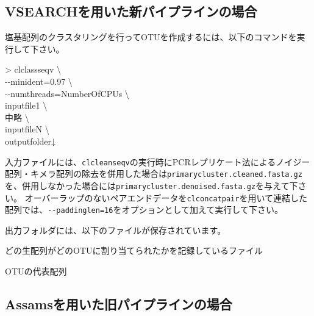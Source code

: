 \documentclass[titlepage,10pt,a4paper,english]{jsbook}
\newenvironment{cmd}{\begin{oframed}\raggedright\ttfamily\footnotesize\setlength{\baselineskip}{1.4em}}{\end{oframed}\vspace{-1em}}
\begin{document}
\subsection{VSEARCHを用いた新パイプラインの場合}

塩基配列のクラスタリングを行ってOTUを作成するには、以下のコマンドを実行して下さい。
\begin{cmd}
{\textgreater} clclassseqv {\textbackslash}\\
{-}{-}minident=0.97 {\textbackslash}\\
{-}{-}numthreads=NumberOfCPUs {\textbackslash}\\
inputfile1 {\textbackslash}\\
中略 {\textbackslash}\\
inputfileN {\textbackslash}\\
outputfolder↓
\end{cmd}
入力ファイルには、\texttt{clcleanseqv}の実行時にPCRレプリケート法によるノイジー配列・キメラ配列の除去を併用した場合は\texttt{primarycluster.cleaned.fasta.gz}を、併用しなかった場合には\texttt{primarycluster.denoised.fasta.gz}を与えて下さい。
オーバーラップのないペアエンドデータを\texttt{clconcatpair}を用いて連結した配列では、\texttt{{-}{-}paddinglen=16}をオプションとして加えて実行して下さい。

出力フォルダには、以下のファイルが保存されています。
\begin{description}\small\setlength{\baselineskip}{1.1em}
\item[clustered.otu.gz] どの生配列がどのOTUに割り当てられたかを記録しているファイル
\item[clustered.fasta.gz] OTUの代表配列
\end{description}

\subsection{Assamsを用いた旧パイプラインの場合}
\end{document}
